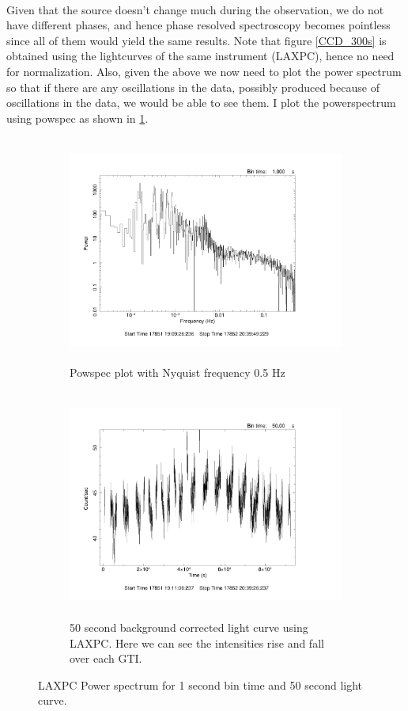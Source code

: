 \documentclass[a4paper,twoside]{report}
\numberwithin{equation}{section}
\begin{document}
\paragraph{}
Given that the source doesn't change much during the observation, we do not have different phases, and hence phase resolved spectroscopy becomes pointless since all of them would yield the same results. Note that figure \ref{CCD_300s} is obtained using the lightcurves of the same instrument (LAXPC), hence no need for normalization. Also, given the above we now need to plot the power spectrum so that if there are any oscillations in the data, possibly produced because of oscillations in the data, we would be able to see them. I plot the powerspectrum using powspec as shown in \ref{Powspec_1s}.
\begin{figure}[h]
\begin{subfigure}{0.48\textwidth}
\includegraphics[width=1.0\linewidth, height=7.5cm]{powspec_1s.pdf} 
\caption{Powspec plot with Nyquist frequency 0.5 Hz}
\label{Powspec_1s}
\end{subfigure}
\begin{subfigure}{0.48\textwidth}
\includegraphics[width=1.0\linewidth, height=7.5cm]{LXPC2_50s.pdf}
\caption{50 second background corrected light curve using LAXPC. Here we can see the intensities rise and fall over each GTI.}
\label{LAXPC2_LC_50s}
\end{subfigure}
\caption{LAXPC Power spectrum for 1 second bin time and 50 second light curve.}
\end{figure}
\end{document}
